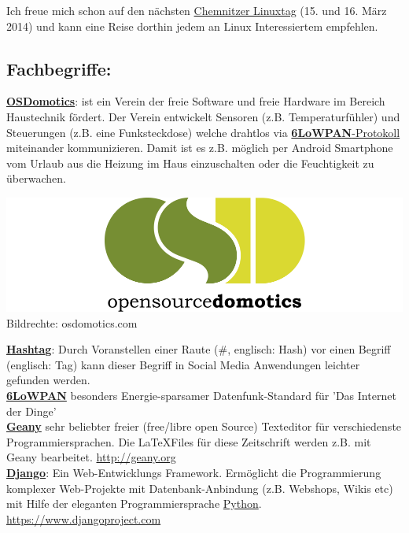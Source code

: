Ich freue mich schon auf den nächsten \href{http://chemnitzer.linux-tage.de/2014/en/info/}{Chemnitzer Linuxtag} (15. und 16. März 2014) und kann eine Reise dorthin jedem an Linux Interessiertem empfehlen.

\subsection*{Fachbegriffe:}
\href{http://www.osdomotics.com/}{\textbf{OSDomotics}}: ist ein Verein der freie Software und freie Hardware im Bereich Haustechnik fördert. Der Verein entwickelt Sensoren (z.B. Temperaturfühler) und Steuerungen (z.B. eine Funksteckdose) welche drahtlos via \href{http://de.wikipedia.org/wiki/6LoWPAN}{\textbf{6LoWPAN}-Protokoll} miteinander kommunizieren. Damit ist es z.B. möglich per Android Smartphone vom Urlaub aus die Heizung im Haus einzuschalten oder die Feuchtigkeit zu überwachen.
\begin{center}
\includegraphics[width=\linewidth]{chemnitz_osd_domotics_logo-2881.png}
\footnotesize{Bildrechte: osdomotics.com}
\end{center}

\href{http://de.wikipedia.org/wiki/Hashtag}{\textbf{Hashtag}}: Durch Voranstellen einer Raute (\#, englisch: Hash) vor einen Begriff (englisch: Tag) kann dieser Begriff in Social Media Anwendungen leichter gefunden werden. \\

\href{http://de.wikipedia.org/wiki/6LoWPAN}{\textbf{6LoWPAN}} besonders Energie-sparsamer  Datenfunk-Standard für 'Das Internet der Dinge'\\

\href{http://geany.org/}{\textbf{Geany}} sehr beliebter freier (free/libre open Source) Texteditor für verschiedenste Programmiersprachen. Die \LaTeX Files für diese Zeitschrift werden z.B. mit Geany bearbeitet. \url{http://geany.org} \\

\href{https://www.djangoproject.com/}{\textbf{Django}}: Ein Web-Entwicklungs Framework. Ermöglicht die Programmierung komplexer Web-Projekte mit Datenbank-Anbindung (z.B. Webshops, Wikis etc) mit Hilfe der eleganten Programmiersprache \href{http://python.org}{Python}. \url{https://www.djangoproject.com} \\

